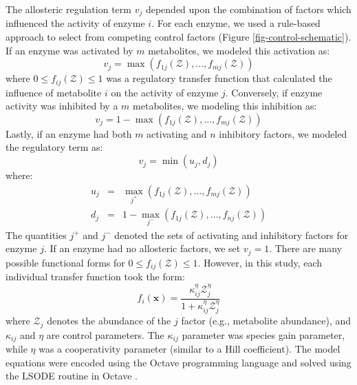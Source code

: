 \documentclass[processes,article,accept,moreauthors,pdftex,12pt,a4paper]{mdpi}
\begin{document}
The allosteric regulation term $v_{j}$ depended upon the combination of factors which influenced the activity of enzyme $i$.
For each enzyme, we used a rule-based approach to select from competing control factors (Figure \ref{fig-control-schematic}). 
If an enzyme was activated by $m$ metabolites, we modeled this activation as:
\begin{equation}
	v_{j} = \max\left(f_{1j}\left(\mathcal{Z}\right),\hdots,f_{mj}\left(\mathcal{Z}\right)\right)
\end{equation}where $0\leq f_{ij}\left(\mathcal{Z}\right)\leq 1$ was a regulatory transfer function that calculated the influence of metabolite $i$ on the activity of enzyme $j$. 
Conversely, if enzyme activity was inhibited by a $m$ metabolites, we modeling this inhibition as:
\begin{equation}
	v_{j} = 1 - \max\left(f_{1j}\left(\mathcal{Z}\right),\hdots,f_{mj}\left(\mathcal{Z}\right)\right)
\end{equation}Lastly, if an enzyme had both $m$ activating and $n$ inhibitory factors, we modeled the regulatory term as:
\begin{equation}
	v_{j} = \min\left(u_{j},d_{j}\right)
\end{equation}where:
\begin{eqnarray}
	u_{j} &=& \max_{j^{+}}\left(f_{1j}\left(\mathcal{Z}\right),\hdots,f_{mj}\left(\mathcal{Z}\right)\right) \\
	d_{j} &=& 1 - \max_{j^{-}}\left(f_{1j}\left(\mathcal{Z}\right),\hdots,f_{nj}\left(\mathcal{Z}\right)\right)
\end{eqnarray}
The quantities $j^{+}$ and $j^{-}$ denoted the sets of activating and inhibitory factors for enzyme $j$. 
If an enzyme had no allosteric factors, we set $v_{j} = 1$.
There are many possible functional forms for $0\leq f_{ij}\left(\mathcal{Z}\right)\leq 1$. 
However, in this study, each individual transfer function took the form:
\begin{equation}\label{eqn:control-factor}
	f_{i}\left(\mathbf{x}\right) = \frac{\kappa_{ij}^{\eta}\mathcal{Z}_{j}^{\eta}}{1 + \kappa_{ij}^{\eta}\mathcal{Z}_{j}^{\eta}}
\end{equation}where $\mathcal{Z}_{j}$ denotes the abundance of the $j$ factor (e.g., metabolite abundance), and $\kappa_{ij}$ and $\eta$ are control parameters. 
The $\kappa_{ij}$ parameter was species gain parameter, while $\eta$ was a cooperativity parameter (similar to a Hill coefficient).
The model equations were encoded using the Octave programming language and solved using the LSODE routine in {Octave} \citep{Octave:2014}.
\end{document}
